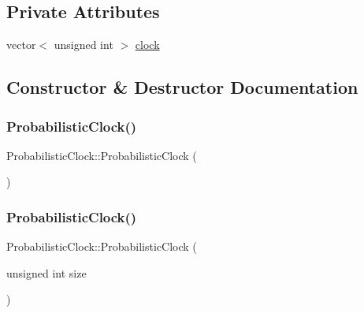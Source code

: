 \subsection*{Private Attributes}
\begin{DoxyCompactItemize}
\item 
vector$<$ unsigned int $>$ \hyperlink{class_probabilistic_clock_a4839958d0e2368cec8bb159b69ac0e76}{clock}
\end{DoxyCompactItemize}


\subsection{Constructor \& Destructor Documentation}
\mbox{\label{class_probabilistic_clock_aa879f0e457bc70644b6e4f2114215987}} 
\subsubsection{\texorpdfstring{Probabilistic\+Clock()}{ProbabilisticClock()}\hspace{0.1cm}{\footnotesize\ttfamily [1/2]}}
{\footnotesize\ttfamily Probabilistic\+Clock\+::\+Probabilistic\+Clock (\begin{DoxyParamCaption}{ }\end{DoxyParamCaption})}

\mbox{\label{class_probabilistic_clock_ab356688e8403176b4211349cba56b9b1}} 
\subsubsection{\texorpdfstring{Probabilistic\+Clock()}{ProbabilisticClock()}\hspace{0.1cm}{\footnotesize\ttfamily [2/2]}}
{\footnotesize\ttfamily Probabilistic\+Clock\+::\+Probabilistic\+Clock (\begin{DoxyParamCaption}\item[{unsigned int}]{size }\end{DoxyParamCaption})}

